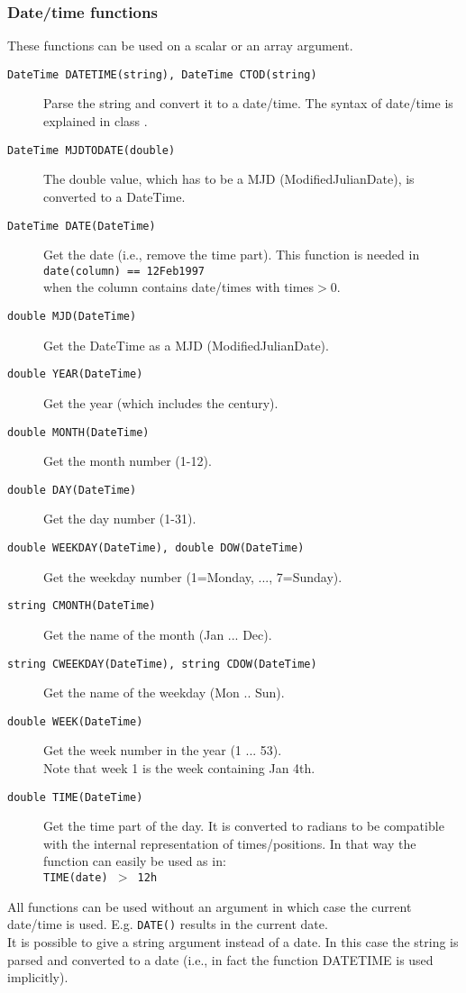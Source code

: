 \subsubsection{Date/time functions}
These functions can be used on a scalar or an array argument.
\begin{description}
  \item[ \texttt{DateTime DATETIME(string),  DateTime CTOD(string)} ]
       Parse the string and convert it to a date/time. The syntax of
       date/time is explained in class
       .
  \item[ \texttt{DateTime MJDTODATE(double)} ]
       The double value, which has to be a MJD (ModifiedJulianDate), is
       converted to a DateTime.
  \item[ \texttt{DateTime DATE(DateTime)}]
        Get the date (i.e., remove the time part). This function is needed in
       \\\texttt{date(column) == 12Feb1997}
       \\when the column contains date/times with times$>$0.
  \item[ \texttt{double MJD(DateTime)}]
        Get the DateTime as a MJD (ModifiedJulianDate).
  \item[ \texttt{double YEAR(DateTime)}]
        Get the year (which includes the century).
  \item[ \texttt{double MONTH(DateTime)}]
        Get the month number (1-12).
  \item[ \texttt{double DAY(DateTime)}]
        Get the day number (1-31).
  \item[ \texttt{double WEEKDAY(DateTime),  double DOW(DateTime)}]
        Get the weekday number (1=Monday, ..., 7=Sunday).
  \item[ \texttt{string CMONTH(DateTime)}]
        Get the name of the month (Jan ... Dec).
  \item[ \texttt{string CWEEKDAY(DateTime),  string CDOW(DateTime)}]
        Get the name of the weekday (Mon .. Sun).
  \item[ \texttt{double WEEK(DateTime)}]
        Get the week number in the year (1 ... 53).
        \\Note that week 1 is the week containing Jan 4th.
  \item[ \texttt{double TIME(DateTime)}]
       Get the time part of the day. It is converted to radians to
       be compatible with the internal representation of times/positions.
       In that way the function can easily be used as in:
       \\\texttt{TIME(date) $>$ 12h}
\end{description}
All functions can be used without an argument in which case the current
date/time is used. E.g. \texttt{DATE()} results in the current date.
\\It is possible to give a string argument instead of a date. In this
case the string is parsed and converted to a date (i.e., in fact the
function DATETIME is used implicitly).

